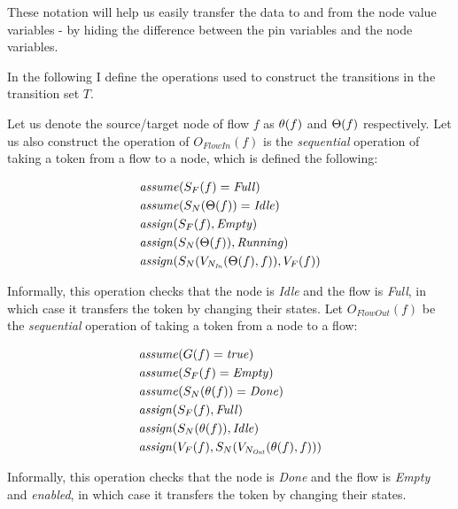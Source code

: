 These notation will help us easily transfer the data to and from the node value variables - by hiding the difference between the pin variables and the node variables.

\newcommand{\enabled}{\mathit{En}}

In the following I define the operations used to construct the transitions in the transition set \(T\). 

\begin{definition}	
	Let us denote the source/target node of flow \(f\) as \( \theta(f) \) and \( \Theta(f) \) respectively. Let us also construct the operation of  \(O_\mathit{FlowIn}(f)\) is the \emph{sequential} operation of taking a token from a flow to a node, which is defined the following:
	
	\begin{align*}
		&\mathit{assume}(S_F(f) = \mathit{Full}) \\
		&\mathit{assume}(S_N(\Theta(f)) = \mathit{Idle}) \\
		&\mathit{assign}(S_F(f), \mathit{Empty}) \\
		&\mathit{assign}(S_N(\Theta(f)), \mathit{Running}) \\
		&\mathit{assign}(S_N(V_{N_\mathit{In}}(\Theta(f), f)), V_F(f)) \\
	\end{align*}

	Informally, this operation checks that the node is \emph{Idle} and the flow is \emph{Full}, in which case it transfers the token by changing their states. Let \(O_\mathit{FlowOut}(f)\) be the \emph{sequential} operation of taking a token from a node to a flow:
	
	\begin{align*}
		&\mathit{assume}(G(f) = \mathit{true}) \\
		&\mathit{assume}(S_F(f) = \mathit{Empty}) \\
		&\mathit{assume}(S_N(\theta(f)) = \mathit{Done}) \\
		&\mathit{assign}(S_F(f), \mathit{Full}) \\
		&\mathit{assign}(S_N(\theta(f)), \mathit{Idle}) \\
		&\mathit{assign}(V_F(f), S_N(V_{N_\mathit{Out}}(\theta(f), f))) \\
	\end{align*}

	Informally, this operation checks that the node is \emph{Done} and the flow is \emph{Empty} and \emph{enabled}, in which case it transfers the token by changing their states.
\end{definition}

